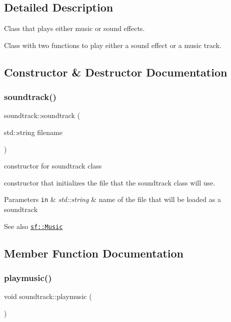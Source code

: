 \subsection{Detailed Description}
Class that plays either music or sound effects. 

Class with two functions to play either a sound effect or a music track. 

\subsection{Constructor \& Destructor Documentation}
\mbox{\label{classsoundtrack_add31bdeb1a693d541443f1d88586d3b6}} 
\subsubsection{\texorpdfstring{soundtrack()}{soundtrack()}}
{\footnotesize\ttfamily soundtrack\+::soundtrack (\begin{DoxyParamCaption}\item[{std\+::string}]{filename }\end{DoxyParamCaption})}



constructor for soundtrack class 

constructor that initializes the file that the soundtrack class will use.


\begin{DoxyParams}[1]{Parameters}
\mbox{\tt in}  & {\em std\+::string} & name of the file that will be loaded as a soundtrack\\
\hline
\end{DoxyParams}
\begin{DoxySeeAlso}{See also}
\href{http://www.sfml-dev.org/documentation/2.0/classsf_1_1Music.php}{\tt sf\+::\+Music} 
\end{DoxySeeAlso}


\subsection{Member Function Documentation}
\mbox{\label{classsoundtrack_a7569a4c0cde86548197756b8e05cf464}} 
\subsubsection{\texorpdfstring{playmusic()}{playmusic()}}
{\footnotesize\ttfamily void soundtrack\+::playmusic (\begin{DoxyParamCaption}{ }\end{DoxyParamCaption})}



